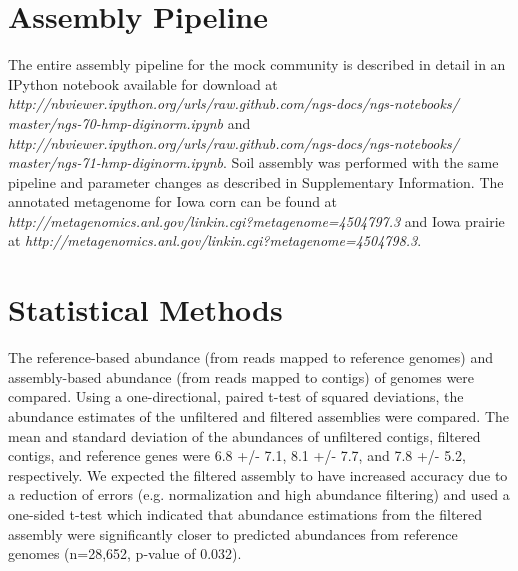 \documentclass{nature}%
\begin{document}
\section*{Assembly Pipeline}

The entire assembly pipeline for the mock community is described in
detail in an IPython notebook available for download at 
\emph{http://nbviewer.ipython.org/urls/raw.github.com/ngs-docs/ngs-notebooks/
master/ngs-70-hmp-diginorm.ipynb}
and 
\emph{http://nbviewer.ipython.org/urls/raw.github.com/ngs-docs/ngs-notebooks/
master/ngs-71-hmp-diginorm.ipynb}.  Soil assembly was performed with
the same pipeline and parameter changes as described in Supplementary Information.
The annotated metagenome for Iowa corn can be found at
\emph{http://metagenomics.anl.gov/linkin.cgi?metagenome=4504797.3} and 
Iowa prairie at \emph{http://metagenomics.anl.gov/linkin.cgi?metagenome=4504798.3}.

\section*{Statistical Methods}
The reference-based abundance (from reads mapped to reference genomes)
and assembly-based abundance (from reads mapped to contigs) of genomes
were compared.  Using a one-directional, paired t-test of squared
deviations, the abundance estimates of the unfiltered and filtered
assemblies were compared.  The mean and standard deviation of 
the abundances of unfiltered contigs, filtered contigs, and reference genes
were 6.8 +/- 7.1, 8.1 +/- 7.7, and 7.8 +/- 5.2, respectively.  We expected the 
filtered assembly to have increased accuracy due to a reduction of errors (e.g. normalization
and high abundance filtering) and used a one-sided t-test which
indicated that abundance estimations from the filtered assembly were
significantly closer to predicted abundances from reference genomes
(n=28,652, p-value of 0.032).

\newpage


\end{document}
